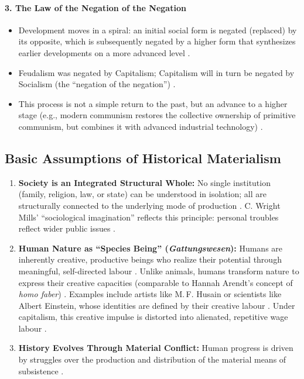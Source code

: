 \paragraph{3. The Law of the Negation of the Negation}
\begin{itemize}
    \item Development moves in a spiral: an initial social form is negated (replaced) by its opposite, which is subsequently negated by a higher form that synthesizes earlier developments on a more advanced level .
    \item Feudalism was negated by Capitalism; Capitalism will in turn be negated by Socialism (the ``negation of the negation'') .
    \item This process is not a simple return to the past, but an advance to a higher stage (e.g., modern communism restores the collective ownership of primitive communism, but combines it with advanced industrial technology) .
\end{itemize}

\subsection{Basic Assumptions of Historical Materialism}

\begin{enumerate}
    \item \textbf{Society is an Integrated Structural Whole:} No single institution (family, religion, law, or state) can be understood in isolation; all are structurally connected to the underlying mode of production . C. Wright Mills' ``sociological imagination'' reflects this principle: personal troubles reflect wider public issues .
    \item \textbf{Human Nature as ``Species Being'' (\textit{Gattungswesen}):} Humans are inherently creative, productive beings who realize their potential through meaningful, self-directed labour . Unlike animals, humans transform nature to express their creative capacities (comparable to Hannah Arendt's concept of \textit{homo faber}) . Examples include artists like M.\,F. Husain or scientists like Albert Einstein, whose identities are defined by their creative labour . Under capitalism, this creative impulse is distorted into alienated, repetitive wage labour .
    \item \textbf{History Evolves Through Material Conflict:} Human progress is driven by struggles over the production and distribution of the material means of subsistence .
\end{enumerate}

